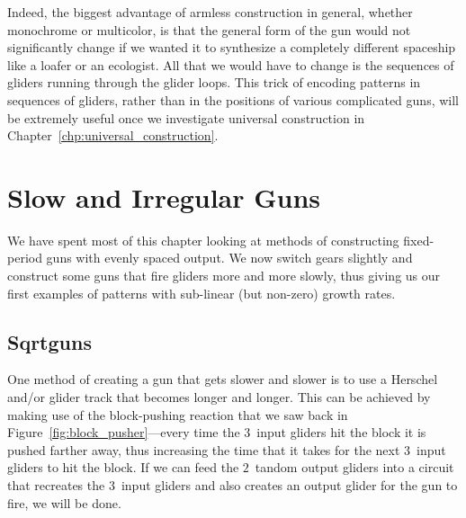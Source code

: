 Indeed, the biggest advantage of armless construction in general, whether monochrome or multicolor, is that the general form of the gun would not significantly change if we wanted it to synthesize a completely different spaceship like a loafer or an ecologist. All that we would have to change is the sequences of gliders running through the glider loops. This trick of encoding patterns in sequences of gliders, rather than in the positions of various complicated guns, will be extremely useful once we investigate universal construction in Chapter~\ref{chp:universal_construction}.


\section{Slow and Irregular Guns}\label{sec:irreg_guns}

We have spent most of this chapter looking at methods of constructing fixed-period guns with evenly spaced output. We now switch gears slightly and construct some guns that fire gliders more and more slowly, thus giving us our first examples of patterns with sub-linear (but non-zero) growth rates.


\subsection{Sqrtguns}\label{sec:sqrt_gun}

One method of creating a gun that gets slower and slower is to use a Herschel and/or glider track that becomes longer and longer. This can be achieved by making use of the block-pushing reaction that we saw back in Figure~\ref{fig:block_pusher}---every time the $3$~input gliders hit the block it is pushed farther away, thus increasing the time that it takes for the next $3$~input gliders to hit the block. If we can feed the $2$~tandom output gliders into a circuit that recreates the $3$~input gliders and also creates an output glider for the gun to fire, we will be done.

